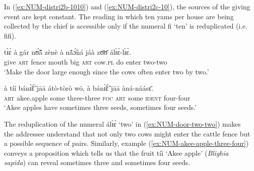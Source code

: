 \begin{exe}
\begin{exe}
\begin{exe}
{\begin{exe}
\begin{exe}
\begin{exe}
\begin{exe}
\begin{exe}
\begin{exe}
\begin{exe}
\begin{exe}
\begin{exe}
In (\ref{ex:NUM-distri2b-1010}) and (\ref{ex:NUM-distri2c-10}), the sources of
the giving event are kept constant. The reading in which
ten yams per house are being collected by the chief is accessible only
if the numeral {\sls fi}  `ten' is reduplicated (i.e.  {\sls fifi}).

\ea
\ea\label{ex:NUM-door-two-two}

 \gll  tɪ̀ɛ̀  à gár  nʊ̃́ã́ zènè  à nã́ɔ̃́ná  jáà  zʊ̄ʊ̄  álɪ̀ɛ̀-lɪ̀ɛ̀.\\
  {give}   \textsc{art}  {fence}  {mouth}   {big}  \textsc{art} 
{cow.\textsc{pl}}   {do} {enter} {two-two}\\
\glt  `Make the door large enough since the cows often enter two by two.'\\


\ex\label{ex:NUM-akee-apple-three-four}

 \gll  à tíí bánɪ̃́ɛ̃́ jāā  átò-tòrò  wō, à  bánɪ̃́ɛ̃́ jāā  àná-náásɛ̄.\\
 \textsc{art}  {akee.apple}  {some}   {three-three}  \textsc{foc}   \textsc{art}   {some}   
\textsc{ident} {four-four}\\
\glt  `Akee apples have sometimes  three seeds, sometimes four seeds.'\\

\z
\z


 



The reduplication of the numeral {\sls álɪ̀ɛ̀} `two' in
(\ref{ex:NUM-door-two-two})
makes the
addressee understand that not only two cows might enter the cattle fence but a
possible sequence of  pairs. Similarly,   example 
(\ref{ex:NUM-akee-apple-three-four}) conveys a proposition which tells us that
the
fruit  {\sls tíì}  `Akee apple' (\textit{Blighia sapida}) can reveal sometimes
three
and sometimes
four seeds.





\end{exe}
\end{exe}
\end{exe}
\end{exe}
\end{exe}
\end{exe}
\end{exe}
\end{exe}
\end{exe}}
\end{exe}
\end{exe}
\end{exe}
